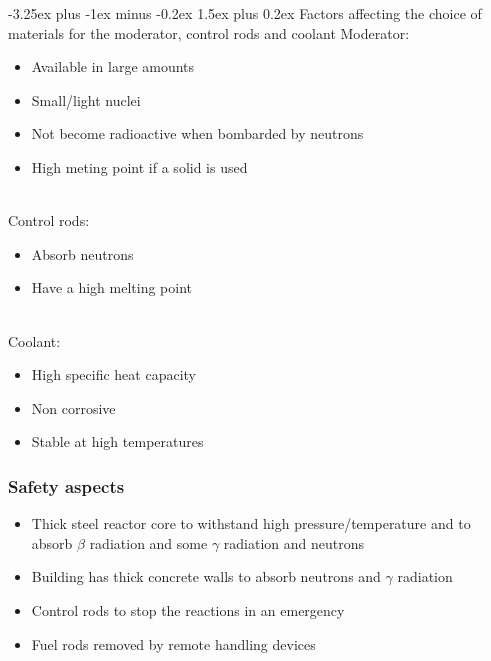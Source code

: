 \documentclass[12pt]{article}
\makeatletter
\renewcommand{\paragraph}{\@startsection{paragraph}{4}{0ex}%
    {-3.25ex plus -1ex minus -0.2ex}%
    {1.5ex plus 0.2ex}%
    {\normalfont\normalsize\bfseries}}
\makeatother
\begin{document}
\paragraph{Factors affecting the choice of materials for the moderator, control rods and coolant}
Moderator:
\begin{itemize}
\item Available in large amounts
\item Small/light nuclei
\item Not become radioactive when bombarded by neutrons
\item High meting point if a solid is used
\end{itemize} $ $\\
Control rods:
\begin{itemize}
\item Absorb neutrons
\item Have a high melting point
\end{itemize} $ $\\
Coolant:
\begin{itemize}
\item High specific heat capacity
\item Non corrosive
\item Stable at high temperatures
\end{itemize}
\subsubsection{Safety aspects}
\begin{itemize}
\item Thick steel reactor core to withstand high pressure/temperature and to absorb $\beta$ radiation and some $\gamma$ radiation and neutrons
\item Building has thick concrete walls to absorb neutrons and $\gamma$ radiation
\item Control rods to stop the reactions in an emergency
\item Fuel rods removed by remote handling devices
\end{itemize}
\end{document}
